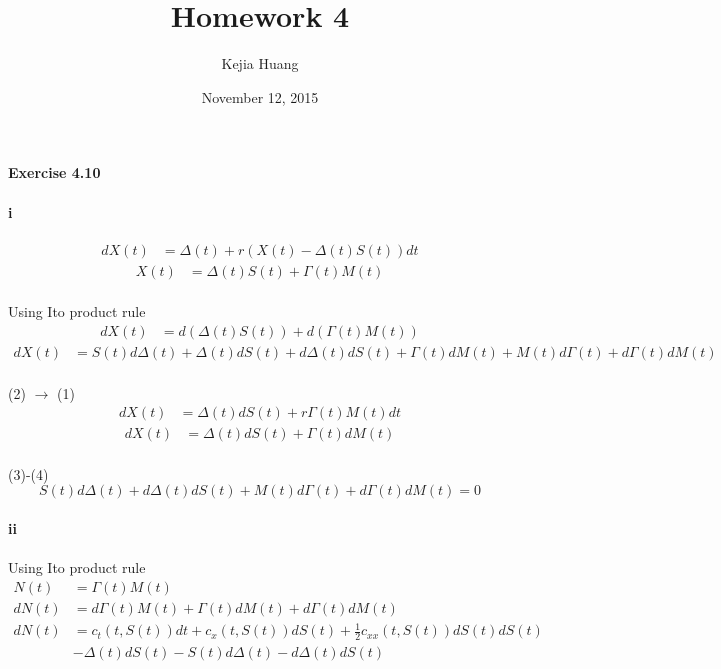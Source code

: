 \documentclass{article}
\begin{document}
\title {Homework 4}
\date {November 12, 2015}
\author{Kejia Huang}
\maketitle

\paragraph{Exercise 4.10}
\paragraph{i}
\begin{align}\label{1}
  dX(t) & =\Delta(t)+r(X(t)-\Delta(t)S(t))dt
\end{align}
\begin{align}\label{2}
  X(t) & =\Delta(t)S(t)+\Gamma(t)M(t)
\end{align}
\paragraph{}{ Using Ito product rule}
\begin{align*}
  dX(t) & =d(\Delta(t)S(t))+d(\Gamma(t)M(t))
  \end{align*}
   \begin{align} \label{3}
    dX(t)& =S(t)d\Delta(t)+\Delta(t)dS(t)+d\Delta(t)dS(t)+ \Gamma(t)dM(t)+M(t)d\Gamma(t)+d\Gamma(t)dM(t)
\end{align}
\paragraph{}{ (2) $\to$ (1)}
\begin{align*}
  dX(t)& =\Delta(t)dS(t)+r\Gamma(t)M(t)dt
  \end{align*}
 \begin{align} \label{4}
  dX(t)&=\Delta(t)dS(t)+\Gamma(t)dM(t)
\end{align}
\paragraph{}{(3)-(4)}
\begin{displaymath}
  S(t)d\Delta(t)+d\Delta(t)dS(t)+M(t)d\Gamma(t)+d\Gamma(t)dM(t)=0
\end{displaymath}
\paragraph{ii}
\paragraph{}{ Using Ito product rule}
\begin{align*}
    N(t) & =\Gamma(t)M(t) \\
  dN(t)  &=d\Gamma(t)M(t)+\Gamma(t)dM(t)+d\Gamma(t)dM(t)\\
  dN(t)&=c_t(t,S(t))dt+c_x(t,S(t))dS(t)+\frac{1}{2}c_{xx}(t,S(t))dS(t)dS(t)\\
  &-\Delta(t)dS(t)-S(t)d\Delta(t)-d\Delta(t)dS(t)
\end{align*}
\end{document}
